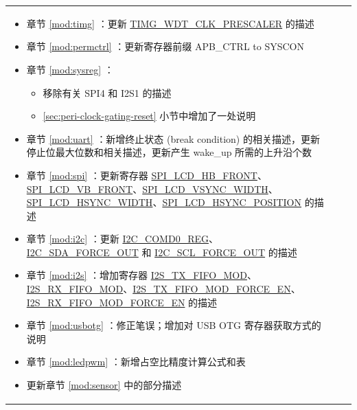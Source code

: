 \begin{longtable}[l]{ | m{2cm} | m{1.5cm} | m{12cm} | }
\begin{itemize}
        \item 章节 \ref{mod:timg} \textit{\nameref{mod:timg}}：更新 \hyperref[fielddesc:TIMGWDTCLKPRESCALER]{TIMG\_WDT\_CLK\_PRESCALER} 的描述 %
        \item 章节 \ref{mod:permctrl} \textit{\nameref{mod:permctrl}}：更新寄存器前缀 APB\_CTRL to SYSCON %
        \item 章节 \ref{mod:sysreg} \textit{\nameref{mod:sysreg}}：
        \begin{itemize}
            \item 移除有关 SPI4 和 I2S1 的描述 %
            \item \ref{sec:peri-clock-gating-reset} 小节中增加了一处说明 %
        \end{itemize}
        \item 章节 \ref{mod:uart} \textit{\nameref{mod:uart}}：新增终止状态 (break condition) 的相关描述，更新停止位最大位数和相关描述，更新产生 wake\_up 所需的上升沿个数 %
        \item 章节 \ref{mod:spi} \textit{\nameref{mod:spi}}：更新寄存器 \hyperref[fielddesc:SPILCDHBFRONT]{SPI\_LCD\_HB\_FRONT}、\hyperref[fielddesc:SPILCDVBFRONT]{SPI\_LCD\_VB\_FRONT}、\hyperref[fielddesc:SPILCDVSYNCWIDTH]{SPI\_LCD\_VSYNC\_WIDTH}、\hyperref[fielddesc:SPILCDHSYNCWIDTH]{SPI\_LCD\_HSYNC\_WIDTH}、\hyperref[fielddesc:SPILCDHSYNCPOSITION]{SPI\_LCD\_HSYNC\_POSITION} 的描述 %
        \item 章节 \ref{mod:i2c} \textit{\nameref{mod:i2c}}：更新 \hyperref[regdesc:I2CCOMD0REG]{I2C\_COMD0\_REG}、\hyperref[fielddesc:I2CSDAFORCEOUT]{I2C\_SDA\_FORCE\_OUT} 和 \hyperref[fielddesc:I2CSCLFORCEOUT]{I2C\_SCL\_FORCE\_OUT} 的描述 %
        \item 章节 \ref{mod:i2s} \textit{\nameref{mod:i2s}}：增加寄存器 \hyperref[fielddesc:I2STXFIFOMOD]{I2S\_TX\_FIFO\_MOD}、\hyperref[fielddesc:I2SRXFIFOMOD]{I2S\_RX\_FIFO\_MOD}、\hyperref[fielddesc:I2STXFIFOMODFORCEEN]{I2S\_TX\_FIFO\_MOD\_FORCE\_EN}、\hyperref[fielddesc:I2SRXFIFOMODFORCEEN]{I2S\_RX\_FIFO\_MOD\_FORCE\_EN} 的描述 %
        \item 章节 \ref{mod:usbotg} \textit{\nameref{mod:usbotg}}：修正笔误；增加对 USB OTG 寄存器获取方式的说明
        \item 章节 \ref{mod:ledpwm} \textit{\nameref{mod:ledpwm}}：新增占空比精度计算公式和表 \textit{\nameref{tab:ledc-common-freq-res}} %

        \item 更新章节 \ref{mod:sensor} \textit{\nameref{mod:sensor}} 中的部分描述


\end{itemize}
\end{longtable}
